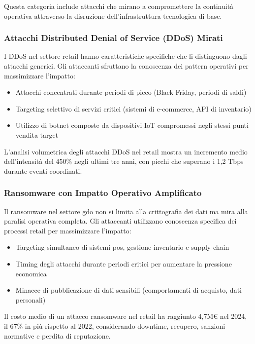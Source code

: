 Questa categoria include attacchi che mirano a compromettere la continuità operativa attraverso la disruzione dell'infrastruttura tecnologica di base.

\subsubsection{Attacchi Distributed Denial of Service (DDoS) Mirati}

I DDoS nel settore retail hanno caratteristiche specifiche che li distinguono dagli attacchi generici. Gli attaccanti sfruttano la conoscenza dei pattern operativi per massimizzare l'impatto:

\begin{itemize}
\item Attacchi concentrati durante periodi di picco (Black Friday, periodi di saldi)
\item Targeting selettivo di servizi critici (sistemi di e-commerce, API di inventario)
\item Utilizzo di botnet composte da dispositivi IoT compromessi negli stessi punti vendita target
\end{itemize}

L'analisi volumetrica degli attacchi DDoS nel retail mostra un incremento medio dell'intensità del 450\% negli ultimi tre anni, con picchi che superano i 1,2 Tbps durante eventi coordinati\autocite{Cloudflare2024}.

\subsubsection{Ransomware con Impatto Operativo Amplificato}

Il ransomware nel settore \gls{gdo} non si limita alla crittografia dei dati ma mira alla paralisi operativa completa. Gli attaccanti utilizzano conoscenza specifica dei processi retail per massimizzare l'impatto:

\begin{itemize}
\item Targeting simultaneo di sistemi \gls{pos}, gestione inventario e supply chain
\item Timing degli attacchi durante periodi critici per aumentare la pressione economica
\item Minacce di pubblicazione di dati sensibili (comportamenti di acquisto, dati personali)
\end{itemize}

Il costo medio di un attacco ransomware nel retail ha raggiunto 4,7M€ nel 2024, il 67\% in più rispetto al 2022, considerando downtime, recupero, sanzioni normative e perdita di reputazione\autocite{CyberseekAlliance2024}.

